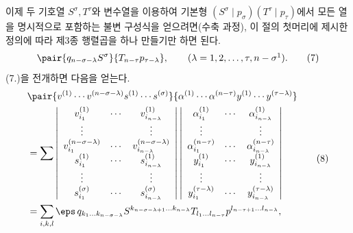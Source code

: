 
이제 두 기호열 $S^\sigma,T^\tau$와 변수열을 이용하여 기본형 $(S^\sigma\mid p_\sigma)(T^\tau\mid p_\tau)$에서 모든 열을 명시적으로 포함하는 불변 구성식을 얻으려면(수축 과정), 이 절의 첫머리에 제시한 정의에 따라 제3종 행렬곱을 하나 만들기만 하면 된다.
\begin{equation}
 \pair{q_{n-\sigma-\lambda}S^\sigma}{T_{n-\tau}p_{\tau-\lambda}},
 \qquad (\lambda=1,2,\ldots,\tau,n-\sigma\footnotemark).
\tag{7}
\end{equation}
(7.)을 전개하면 다음을 얻는다.
\begingroup
\setlength{\arraycolsep}{2pt}
\begin{equation}
\begin{aligned}
&\pair{v^{(1)}\cdots v^{(n-\sigma-\lambda)}s^{(1)}\cdots s^{(\sigma)}}
       {\alpha^{(1)}\cdots\alpha^{(n-\tau)}y^{(1)}\cdots y^{(\tau-\lambda)}} \\
&=\sum
\left|\begin{array}{ccc}
 v_{i_1}^{(1)}&\cdots&v_{i_{n-\lambda}}^{(1)}\\
 \vdots&&\vdots\\
 v_{i_1}^{(n-\sigma-\lambda)}&\cdots&v_{i_{n-\lambda}}^{(n-\sigma-\lambda)}\\
 s_{i_1}^{(1)}&\cdots&s_{i_{n-\lambda}}^{(1)}\\
 \vdots&&\vdots\\
 s_{i_1}^{(\sigma)}&\cdots&s_{i_{n-\lambda}}^{(\sigma)}
\end{array}\right|
\left|\begin{array}{ccc}
 \alpha_{i_1}^{(1)}&\cdots&\alpha_{i_{n-\lambda}}^{(1)}\\
 \vdots&&\vdots\\
 \alpha_{i_1}^{(n-\tau)}&\cdots&\alpha_{i_{n-\lambda}}^{(n-\tau)}\\
 y_{i_1}^{(1)}&\cdots&y_{i_{n-\lambda}}^{(1)}\\
 \vdots&&\vdots\\
 y_{i_1}^{(\tau-\lambda)}&\cdots&y_{i_{n-\lambda}}^{(\tau-\lambda)}
\end{array}\right|\\
&=\sum_{i,k,l}\eps\,q_{k_1\ldots k_{n-\sigma-\lambda}}
 S^{k_{n-\sigma-\lambda+1}\ldots k_{n-\lambda}}
 T_{l_1\ldots l_{n-\tau}}
 p^{l_{n-\tau+1}\ldots l_{n-\lambda}},
\end{aligned}
\tag{8}
\end{equation}
